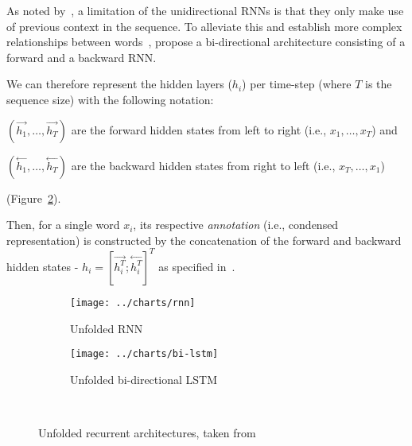 As noted by~\cite{graveshinton2013speech}, a limitation of the unidirectional RNNs is that they only make use of previous context in the sequence.
To alleviate this and establish more complex relationships between words~\cite{schuster1997birnn}, propose a bi-directional architecture consisting of a forward and a backward RNN\@.

We can therefore represent the hidden layers ($h_i$) per time-step (where $T$ is the sequence size) with the following notation: \begin{enumerate*}
    \item $(\overset{\longrightarrow}{h_1}, \ldots, \overset{\longrightarrow}{h_T})$ are the forward hidden states from left to right (i.e., $x_1,\ldots,x_T$) and
    \item $(\overset{\longleftarrow}{h_1}, \ldots, \overset{\longleftarrow}{h_T})$ are the backward hidden states from right to left (i.e., $x_T,\ldots,x_1$)
\end{enumerate*} (Figure~\ref{fig:bilstm}).

Then, for a single word $x_i$, its respective \emph{annotation} (i.e., condensed representation) is constructed by the concatenation of the forward and backward hidden states - $h_i = [\overset{\longrightarrow}{h_i^T}; \overset{\longleftarrow}{h_i^T}]^T$ as specified in~\cite{bahdanau2016neural}.

\begin{figure}[ht]
    \begin{subfigure}{0.49\textwidth}
        \centering
        \texttt{[image: ../charts/rnn]}
        \caption{Unfolded RNN}
        \label{fig:rnn}
    \end{subfigure}%
    \hfill
    \begin{subfigure}{0.49\textwidth}
        \centering
        \texttt{[image: ../charts/bi-lstm]}
        \caption{Unfolded bi-directional LSTM}
        \label{fig:bilstm}
    \end{subfigure}~\caption{Unfolded recurrent architectures, taken from~\cite{zhiyong2018bilstm}}
    \label{fig:recurrent_unfolded}
\end{figure}

